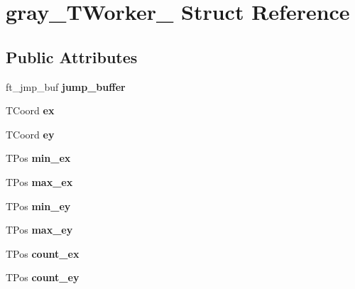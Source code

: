 \hypertarget{structgray___t_worker__}{}\section{gray\+\_\+\+T\+Worker\+\_\+ Struct Reference}
\label{structgray___t_worker__}
\subsection*{Public Attributes}
\begin{DoxyCompactItemize}
\item 
\mbox{\label{structgray___t_worker___aaf6c16d2d63e6929fa1862f26fdf2e7a}} 
ft\+\_\+jmp\+\_\+buf {\bfseries jump\+\_\+buffer}
\item 
\mbox{\label{structgray___t_worker___a22e4cb2c697bd4a7ccbd3cf8e5775f8a}} 
T\+Coord {\bfseries ex}
\item 
\mbox{\label{structgray___t_worker___a64b4f060baae3892096b074ffe0f3286}} 
T\+Coord {\bfseries ey}
\item 
\mbox{\label{structgray___t_worker___af9b1c6c147b3cd692735a883e6a09700}} 
T\+Pos {\bfseries min\+\_\+ex}
\item 
\mbox{\label{structgray___t_worker___ae0b1455a3436f0ad5390b181fed003fc}} 
T\+Pos {\bfseries max\+\_\+ex}
\item 
\mbox{\label{structgray___t_worker___a78316c1c45d074278196ca2c1af17a6a}} 
T\+Pos {\bfseries min\+\_\+ey}
\item 
\mbox{\label{structgray___t_worker___aecc55c9d2b2c460b4423a56e2d84db2a}} 
T\+Pos {\bfseries max\+\_\+ey}
\item 
\mbox{\label{structgray___t_worker___a61b2d0c288365136a1a9c71d942446c4}} 
T\+Pos {\bfseries count\+\_\+ex}
\item 
\mbox{\label{structgray___t_worker___a9e400ce9cec064a14fab7ab81b2a2335}} 
T\+Pos {\bfseries count\+\_\+ey}

\end{DoxyCompactItemize}
